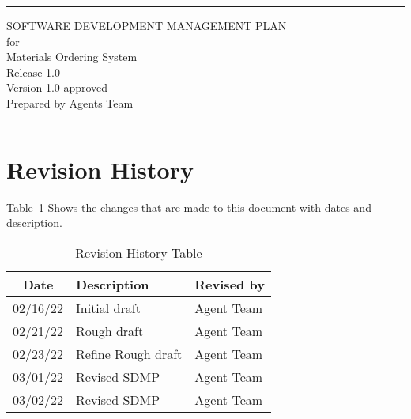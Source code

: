 \documentclass[letterpaper,12pt,oneside,listof=totoc]{scrreprt}
\date{\today}
\author{} %
\def\myversion{1.0 }
\begin{document}
\begin{titlepage}
\flushright
\rule{\textwidth}{5pt}\vskip1cm
\Huge{SOFTWARE DEVELOPMENT MANAGEMENT PLAN}\\
\vspace{1.5cm}
for\\
\vspace{1.5cm}
Materials Ordering System\\
\vspace{1.5cm}
\LARGE{Release 1.0\\}
\vspace{1.5cm}
\LARGE{Version \myversion approved\\}
\vspace{1.5cm}
Prepared by Agents Team\\
\vfill
\rule{\textwidth}{5pt}
\end{titlepage}

\tableofcontents



\listoftables

\chapter*{Revision History}
Table~\ref{table:1}  Shows the changes that are made to this document with dates and description. 

\begin{table}[h!]
\centering
\begin{tabular}{| c | p{} | p{} |}
\hline
Date     & Description   & Revised by \\
\hline
02/16/22 & Initial draft & Agent Team \\
\hline
02/21/22 & Rough draft & Agent Team \\
\hline
02/23/22 & Refine Rough draft & Agent Team \\
\hline
03/01/22 & Revised SDMP & Agent Team\\
\hline
03/02/22 & Revised SDMP & Agent Team\\
\hline
\end{tabular}
\caption{Revision History Table}
\label{table:1}
\end{table}
\end{document}
